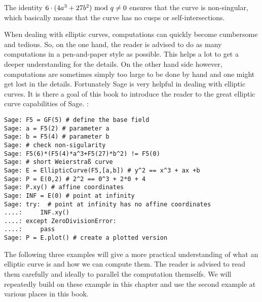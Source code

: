 The identity $6\cdot(4a^3+ 27b^2) \text{ mod } q\neq 0$ ensures that the curve is  non-singular, which basically means that the curve has no cusps or self-intersections.

When dealing with elliptic curves, computations can quickly become cumbersome and tedious. So, on the one hand, the reader is advised to do as many computations in a pen-and-paper style as possible. This helps a lot to get a deeper understanding for the details. On the other hand side however, computations are sometimes simply too large to be done by hand and one might get lost in the details. Fortunately Sage is very helpful in dealing with elliptic curves. It is there a goal of this book to introduce the reader to the great elliptic curve capabilities of Sage. :
\begin{verbatim}
Sage: F5 = GF(5) # define the base field
Sage: a = F5(2) # parameter a
Sage: b = F5(4) # parameter b
Sage: # check non-sigularity
Sage: F5(6)*(F5(4)*a^3+F5(27)*b^2) != F5(0)
Sage: # short Weierstraß curve 
Sage: E = EllipticCurve(F5,[a,b]) # y^2 == x^3 + ax +b 
Sage: P = E(0,2) # 2^2 == 0^3 + 2*0 + 4
Sage: P.xy() # affine coordinates
Sage: INF = E(0) # point at infinity
Sage: try: 	# point at infinity has no affine coordinates
....:     INF.xy()
....: except ZeroDivisionError:
....:     pass
Sage: P = E.plot() # create a plotted version 
\end{verbatim}
The following three examples will give a more practical understanding of what an elliptic curve is and how we can compute them. The reader is advised to read them carefully and ideally to parallel the computation themselfs. We will repeatedly build on these example in this chapter and use the second example at various places in this book.

